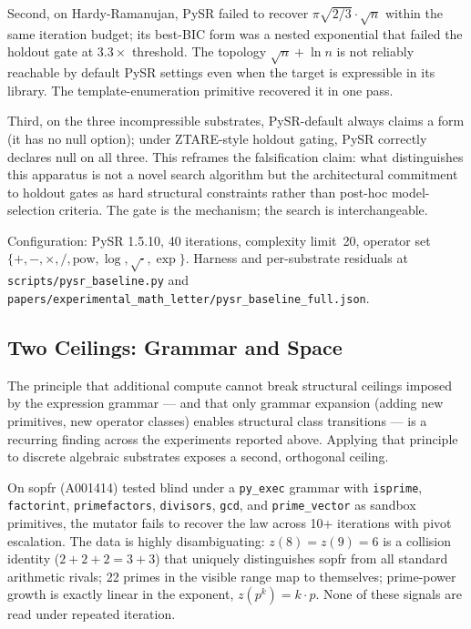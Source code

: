 \documentclass[12pt]{article}
\begin{document}
Second, on Hardy-Ramanujan, PySR failed to recover $\pi\sqrt{2/3} \cdot \sqrt{n}$ within the same iteration budget; its best-BIC form was a nested exponential that failed the holdout gate at $3.3\times$ threshold. The topology $\sqrt{n} + \ln n$ is not reliably reachable by default PySR settings even when the target is expressible in its library. The template-enumeration primitive recovered it in one pass.

Third, on the three incompressible substrates, PySR-default always claims a form (it has no null option); under ZTARE-style holdout gating, PySR correctly declares null on all three. This reframes the falsification claim: what distinguishes this apparatus is not a novel search algorithm but the architectural commitment to holdout gates as hard structural constraints rather than post-hoc model-selection criteria. The gate is the mechanism; the search is interchangeable.

Configuration: PySR 1.5.10, 40 iterations, complexity limit~20, operator set $\{+, -, \times, /, \mathrm{pow}, \log, \sqrt{\cdot}, \exp\}$. Harness and per-substrate residuals at \texttt{scripts/pysr\_baseline.py} and \texttt{papers/experimental\_math\_letter/pysr\_baseline\_full.json}.

\subsection{Two Ceilings: Grammar and Space}
\label{sec:two-ceilings}

The principle that additional compute cannot break structural ceilings imposed by the expression grammar — and that only grammar expansion (adding new primitives, new operator classes) enables structural class transitions — is a recurring finding across the experiments reported above. Applying that principle to discrete algebraic substrates exposes a second, orthogonal ceiling.

On sopfr (A001414) tested blind under a \texttt{py\_exec} grammar with \texttt{isprime}, \texttt{factorint}, \texttt{primefactors}, \texttt{divisors}, \texttt{gcd}, and \texttt{prime\_vector} as sandbox primitives, the mutator fails to recover the law across 10+ iterations with pivot escalation. The data is highly disambiguating: $z(8) = z(9) = 6$ is a collision identity ($2 + 2 + 2 = 3 + 3$) that uniquely distinguishes sopfr from all standard arithmetic rivals; 22 primes in the visible range map to themselves; prime-power growth is exactly linear in the exponent, $z(p^k) = k \cdot p$. None of these signals are read under repeated iteration.
\end{document}
